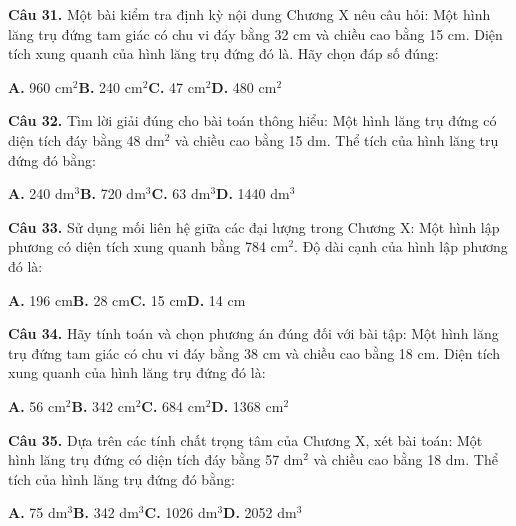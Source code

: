 \documentclass[11pt,a4paper]{article}
\begin{document}
\textbf{\color{primary} Câu 31.} Một bài kiểm tra định kỳ nội dung Chương X nêu câu hỏi: Một hình lăng trụ đứng tam giác có chu vi đáy bằng 32 cm và chiều cao bằng 15 cm. Diện tích xung quanh của hình lăng trụ đứng đó là. Hãy chọn đáp số đúng:\par
\hspace*{1.5em}\textbf{A.} 960 cm$^2$\quad\quad \textbf{B.} 240 cm$^2$\quad\quad \textbf{C.} 47 cm$^2$\quad\quad \textbf{D.} 480 cm$^2$\par\vspace{2pt}
\textbf{\color{primary} Câu 32.} Tìm lời giải đúng cho bài toán thông hiểu: Một hình lăng trụ đứng có diện tích đáy bằng 48 dm$^2$ và chiều cao bằng 15 dm. Thể tích của hình lăng trụ đứng đó bằng:\par
\hspace*{1.5em}\textbf{A.} 240 dm$^3$\quad\quad \textbf{B.} 720 dm$^3$\quad\quad \textbf{C.} 63 dm$^3$\quad\quad \textbf{D.} 1440 dm$^3$\par\vspace{2pt}
\textbf{\color{primary} Câu 33.} Sử dụng mối liên hệ giữa các đại lượng trong Chương X: Một hình lập phương có diện tích xung quanh bằng 784 cm$^2$. Độ dài cạnh của hình lập phương đó là:\par
\hspace*{1.5em}\textbf{A.} 196 cm\quad\quad \textbf{B.} 28 cm\quad\quad \textbf{C.} 15 cm\quad\quad \textbf{D.} 14 cm\par\vspace{2pt}
\textbf{\color{primary} Câu 34.} Hãy tính toán và chọn phương án đúng đối với bài tập: Một hình lăng trụ đứng tam giác có chu vi đáy bằng 38 cm và chiều cao bằng 18 cm. Diện tích xung quanh của hình lăng trụ đứng đó là:\par
\hspace*{1.5em}\textbf{A.} 56 cm$^2$\quad\quad \textbf{B.} 342 cm$^2$\quad\quad \textbf{C.} 684 cm$^2$\quad\quad \textbf{D.} 1368 cm$^2$\par\vspace{2pt}
\textbf{\color{primary} Câu 35.} Dựa trên các tính chất trọng tâm của Chương X, xét bài toán: Một hình lăng trụ đứng có diện tích đáy bằng 57 dm$^2$ và chiều cao bằng 18 dm. Thể tích của hình lăng trụ đứng đó bằng:\par
\hspace*{1.5em}\textbf{A.} 75 dm$^3$\quad\quad \textbf{B.} 342 dm$^3$\quad\quad \textbf{C.} 1026 dm$^3$\quad\quad \textbf{D.} 2052 dm$^3$\par\vspace{2pt}
\end{document}
